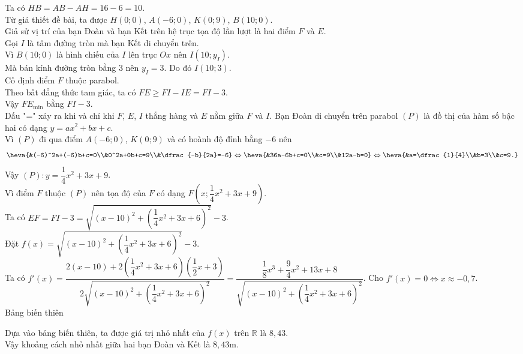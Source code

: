 \begin{bt}
{Ta có $HB=AB-AH=16-6=10$.\\
Từ giả thiết đề bài, ta được $H(0;0)$, $A(-6;0)$, $K(0;9)$, $B(10;0)$.\\
Giả sử vị trí của bạn Đoàn và bạn Kết trên hệ trục tọa độ lần lượt là hai điểm $F$ và $E$.\\
Gọi $I$ là tâm đường tròn mà bạn Kết di chuyển trên.\\
Vì $B(10;0)$ là hình chiếu của $I$ lên trục $Ox$ nên $I(10;y_I)$.\\
Mà bán kính đường tròn bằng $3$ nên $y_I=3$. Do đó $I(10;3)$.\\
Cố định điểm $F$ thuộc parabol. \\
Theo bất đẳng thức tam giác, ta có $FE \ge FI-IE = FI-3$.\\
Vậy $FE_\text{min}$ bằng $FI-3$.\\
Dấu "=" xảy ra khi và chỉ khi $F$, $E$, $I$ thẳng hàng và $E$ nằm giữa $F$ và $I$.
Bạn Đoàn di chuyển trên parabol $(P)$ là đồ thị của hàm số bậc hai có dạng $y=ax^2+bx+c$.\\
Vì $(P)$ đi qua điểm $A(-6;0)$, $K(0;9)$ và có hoành độ đỉnh bằng $-6$ nên
$$\heva{&(-6)^2a+(-6)b+c=0\\&0^2a+0b+c=9\\&\dfrac{-b}{2a}=-6} \Leftrightarrow \heva{&36a-6b+c=0\\&c=9\\&12a-b=0} \Leftrightarrow \heva{&a=\dfrac{1}{4}\\&b=3\\&c=9.}$$
Vậy $(P) \colon y =\dfrac{1}{4}x^2+3x+9$.\\
Vì điểm $F$ thuộc $(P)$ nên tọa độ của $F$ có dạng $F \left(x;\dfrac{1}{4}x^2+3x+9\right)$.\\
Ta có $EF=FI-3=\sqrt{(x-10)^2+\left(\dfrac{1}{4}x^2+3x+6\right)^2}-3$.\\
Đặt $f(x)=\sqrt{(x-10)^2+\left(\dfrac{1}{4}x^2+3x+6\right)^2}-3$.\\
Ta có $f'(x)=\dfrac{2(x-10)+2\left(\dfrac{1}{4}x^2+3x+6\right)\left(\dfrac{1}{2}x+3\right)}{2\sqrt{(x-10)^2+\left(\dfrac{1}{4}x^2+3x+6\right)^2}}=\dfrac{\dfrac{1}{8}x^3+\dfrac{9}{4}x^2+13x+8}{\sqrt{(x-10)^2+\left(\dfrac{1}{4}x^2+3x+6\right)^2}}$.
Cho $f'(x)=0 \Leftrightarrow x \approx -0{,}7$.\\
Bảng biến thiên
\begin{center}
\end{center}
Dựa vào bảng biến thiên, ta được giá trị nhỏ nhất của $f(x)$ trên $\mathbb{R}$ là $8{,}43$.\\
Vậy khoảng cách nhỏ nhất giữa hai bạn Đoàn và Kết là $8{,}43$m.
}
\end{bt}

